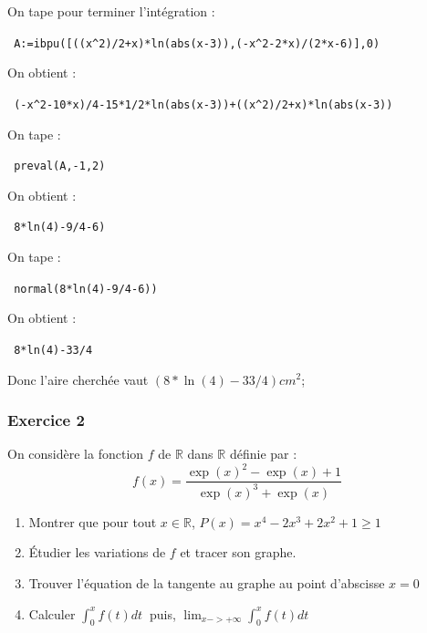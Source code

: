 \documentclass{article}
\begin{document}
\begin{enumerate}
On tape pour terminer l'int\'egration :
\begin{center}
\verb| A:=ibpu([((x^2)/2+x)*ln(abs(x-3)),(-x^2-2*x)/(2*x-6)],0)|
\end{center}
On obtient :
\begin{center}
\verb| (-x^2-10*x)/4-15*1/2*ln(abs(x-3))+((x^2)/2+x)*ln(abs(x-3))|
\end{center}
On tape :
\begin{center}
\verb| preval(A,-1,2)|
\end{center}
On obtient :
\begin{center}
\verb| 8*ln(4)-9/4-6)|
\end{center}
On tape :
\begin{center}
\verb| normal(8*ln(4)-9/4-6))|
\end{center}
On obtient :
\begin{center}
\verb| 8*ln(4)-33/4|
\end{center}
Donc l'aire cherch\'ee vaut  $(8*\ln(4)-33/4) cm^2$;
\end{enumerate}

\subsubsection{Exercice 2}
On consid\`ere la fonction $f$ de $\mathbb R$ dans $\mathbb R$ d\'efinie par :
$$f(x)=\frac{\exp(x)^2-\exp(x)+1}{\exp(x)^3+\exp(x)}$$
\begin{enumerate}
\item  Montrer que pour tout $x \in \mathbb R$, $P(x)=x^4-2x^3+2x^2+1 \geq 1$
\item  \'Etudier les variations de $f$ et tracer son graphe.
\item  Trouver l'\'equation de la tangente au graphe au point d'abscisse $x=0$
\item  Calculer $\displaystyle \int_0^x f(t)dt \ $ puis,
  $\displaystyle \lim_{x->+\infty}\int_0^x f(t)dt $
\end{enumerate}
\end{document}
